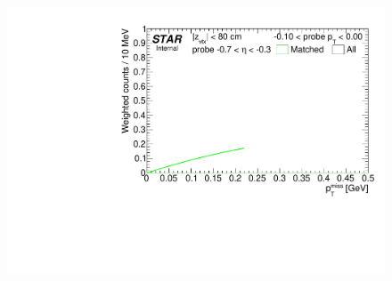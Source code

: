 \begin{figure}[h!]
{  \includegraphics[width=\linewidth,page=11]{graphics/correctionsToEff/TOF_tagAndProbe/Fitting_effVsPt_mc_ETABINS_D.CPT2.pdf}

}
\end{figure}

